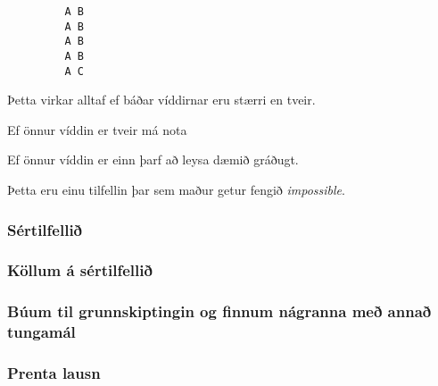 { \begin{verbatim}
         A B
         A B
         A B
         A B
         A C
\end{verbatim} }

{
	{
		\item<1-> Þetta virkar alltaf ef báðar víddirnar eru stærri en tveir.
		\item<2-> Ef önnur víddin er tveir má nota
		\item<3->[] \caseA
		\item<4-> Ef önnur víddin er einn þarf að leysa dæmið gráðugt.
		\item<5-> Þetta eru einu tilfellin þar sem maður getur fengið \emph{impossible}.
	}
}

{
	\frametitle{Sértilfellið}
}

{
	\frametitle{Köllum á sértilfellið}
}

{
	\frametitle{Búum til grunnskiptingin og finnum nágranna með annað tungamál}
}

{
	\frametitle{Prenta lausn}
}

{
}


